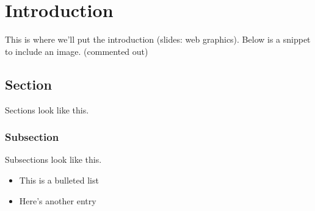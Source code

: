 %
%
% 
% 


\chapter{Introduction}

\label{chap:Intro}
This is where we'll put the introduction (slides: web graphics).
Below is a snippet to include an image. (commented out)

% 

\section{Section}
Sections look like this.

\subsection{Subsection}
Subsections look like this.

\begin{itemize}
\item This is a bulleted list
\item Here's another entry
\end{itemize}
